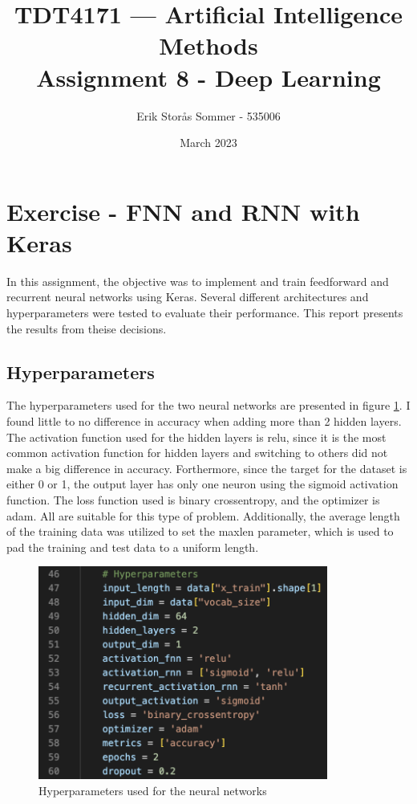 \documentclass{article}
\title{TDT4171 — Artificial Intelligence Methods \\ Assignment 8 - Deep Learning}
\author{Erik Storås Sommer - 535006}
\date{March 2023}
\begin{document}
\maketitle
\setlength{\parindent}{0pt}

\section*{Exercise - FNN and RNN with Keras}

In this assignment, the objective was to implement and train feedforward and recurrent neural networks using Keras.
Several different architectures and hyperparameters were tested to evaluate their performance.
This report presents the results from theise decisions.
\subsection*{Hyperparameters}

The hyperparameters used for the two neural networks are presented in figure \ref{fig:image1}. I found little to no difference in accuracy when adding more than 2 hidden layers.
The activation function used for the hidden layers is relu, since it is the most common activation function for hidden layers and switching to others did not make a big difference in accuracy.
Forthermore, since the target for the dataset is either 0 or 1, the output layer has only one neuron using the sigmoid activation function.
The loss function used is binary crossentropy, and the optimizer is adam.
All are suitable for this type of problem.
Additionally, the average length of the training data was utilized to set the maxlen parameter, which is used to pad the training and test data to a uniform length.

\begin{figure}[hbtp]
    \centering
    \includegraphics[width=0.85\textwidth]{hyperparameters.png}
    \caption{Hyperparameters used for the neural networks}
    \label{fig:image1}
\end{figure}
\end{document}
